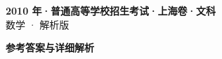 \documentclass[zihao=-4, a4paper]{ctexart}
\begin{document}
\begin{center}
  {\Large\bfseries 2010 年·普通高等学校招生考试·上海卷·文科}\\[4pt]
  {\large 数学 · 解析版}
\end{center}
\medskip
{}

\clearpage
{}
\begin{center}{\Large\bfseries 参考答案与详细解析}\end{center}
\medskip

\end{document}
